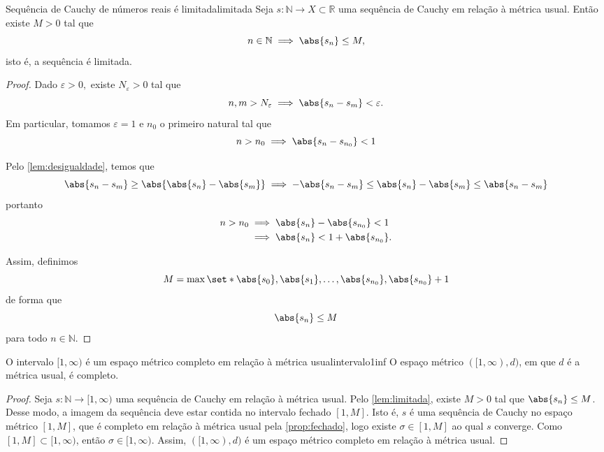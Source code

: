 \begin{lemma}{Sequência de Cauchy de números reais é limitada}{limitada}
    Seja \(s : \mathbb{N} \to X \subset \mathbb{R}\) uma sequência de Cauchy em relação à métrica usual. Então existe \(M > 0\) tal que
    \begin{equation*}
        n \in \mathbb{N} \implies \abs{s_n} \leq M,
    \end{equation*}
    isto é, a sequência é limitada.
\end{lemma}
\begin{proof}
    Dado \(\varepsilon > 0,\) existe \(N_{\varepsilon} > 0\) tal que
    \begin{equation*}
        n, m > N_{\varepsilon} \implies \abs{s_n - s_m} < \varepsilon.
    \end{equation*}
    Em particular, tomamos \(\varepsilon = 1\) e \(n_0\) o primeiro natural tal que
    \begin{equation*}
        n > n_0 \implies \abs{s_n - s_{n_0}} < 1
    \end{equation*}

    Pelo \cref{lem:desigualdade}, temos que
    \begin{equation*}
        \abs{s_n - s_m} \geq \abs{\abs{s_n} - \abs{s_m}} \implies -\abs{s_n - s_m}\leq \abs{s_n} - \abs{s_m} \leq \abs{s_n - s_m}
    \end{equation*}
    portanto
    \begin{align*}
        n > n_0 &\implies \abs{s_n} - \abs{s_{n_0}} < 1\\
                &\implies \abs{s_n} < 1 + \abs{s_{n_0}}.
    \end{align*}

    Assim, definimos
    \begin{equation*}
        M = \max\set*{\abs{s_0}, \abs{s_1}, \dots, \abs{s_{n_0}}, \abs{s_{n_0}}+ 1}
    \end{equation*}
    de forma que
    \begin{equation*}
        \abs{s_n} \leq M
    \end{equation*}
    para todo \(n \in \mathbb{N}\).
\end{proof}

\begin{proposition}{O intervalo \([1,\infty)\) é um espaço métrico completo em relação à métrica usual}{intervalo1inf}
    O espaço métrico \(([1,\infty), d)\), em que \(d\) é a métrica usual, é completo.
\end{proposition}
\begin{proof}
    Seja \(s : \mathbb{N} \to [1,\infty)\) uma sequência de Cauchy em relação à métrica usual. Pelo \cref{lem:limitada}, existe \(M > 0\) tal que \(\abs{s_n} \leq M\). Desse modo, a imagem da sequência deve estar contida no intervalo fechado \([1, M]\). Isto é, \(s\) é uma sequência de Cauchy no espaço métrico \([1, M]\), que é completo em relação à métrica usual pela \cref{prop:fechado}, logo existe \(\sigma \in [1,M]\) ao qual \(s\) converge. Como \([1, M] \subset [1, \infty)\), então \(\sigma \in [1, \infty)\). Assim, \(([1,\infty), d)\) é um espaço métrico completo em relação à métrica usual.
\end{proof}

